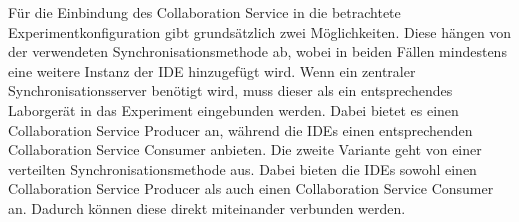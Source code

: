 Für die Einbindung des Collaboration Service in die betrachtete Experimentkonfiguration gibt grundsätzlich zwei Möglichkeiten. Diese hängen von der verwendeten Synchronisationsmethode ab, wobei in beiden Fällen mindestens eine weitere Instanz der IDE hinzugefügt wird. Wenn ein zentraler Synchronisationsserver benötigt wird, muss dieser als ein entsprechendes Laborgerät in das Experiment eingebunden werden. Dabei bietet es einen Collaboration Service Producer an, während die IDEs einen entsprechenden Collaboration Service Consumer anbieten. Die zweite Variante geht von einer verteilten Synchronisationsmethode aus. Dabei bieten die IDEs sowohl einen Collaboration Service Producer als auch einen Collaboration Service Consumer an. Dadurch können diese direkt miteinander verbunden werden.